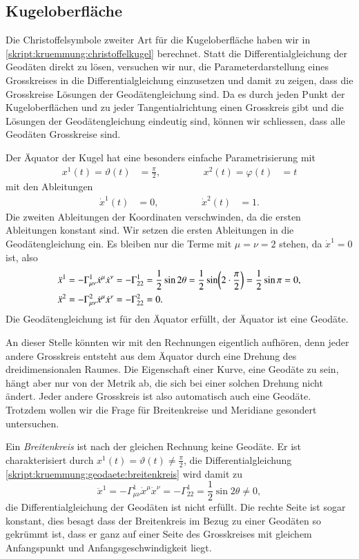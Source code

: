 \subsection{Kugeloberfläche}
Die Christoffelsymbole zweiter Art für die Kugeloberfläche haben wir
in \eqref{skript:kruemmung:christoffelkugel} berechnet.
Statt die Differentialgleichung der Geodäten direkt zu lösen, versuchen
wir nur, die Parameterdarstellung eines Grosskreises in die
Differentialgleichung einzusetzen und damit zu zeigen, dass die
Grosskreise Lösungen der Geodätengleichung sind.
Da es durch jeden Punkt der Kugeloberflächen und zu jeder Tangentialrichtung
einen Grosskreis gibt und die Lösungen der Geodätengleichung eindeutig
sind, können wir schliessen, dass alle Geodäten Grosskreise sind.

Der Äquator der Kugel hat eine besonders einfache Parametrisierung mit
%
\[
\begin{aligned}
x^1(t)=\vartheta(t)&=\frac{\pi}2,
&\qquad&&
x^2(t)=\varphi(t)&=t
\end{aligned}
\]
mit den Ableitungen
\[
\begin{aligned}
\dot x^1(t)&=0,
&\qquad&&
\dot x^2(t)&=1.
\end{aligned}
\]
Die zweiten Ableitungen der Koordinaten verschwinden, da die ersten
Ableitungen konstant sind.
Wir setzen die ersten Ableitungen in die Geodätengleichung ein.
Es bleiben nur die Terme mit $\mu=\nu=2$ stehen, da $\dot x^1=0$ ist,
also
\begin{align}
\ddot x^1
&=
-\Gamma_{\mu\nu}^1\dot x^\mu\dot x^\nu
=
-\Gamma_{22}^1=\frac12\sin2\theta
=
\frac12\sin\biggl( 2\cdot\frac{\pi}2\biggr)
=
\frac12\sin\pi
=
0,
\label{skript:kruemmung:geodaete:breitenkreis}
\\
\ddot x^2
&=
-\Gamma_{\mu\nu}^2\dot x^\mu\dot x^\nu
=
-\Gamma_{22}^2=0.
\notag
\end{align}
Die Geodätengleichung ist für den Äquator erfüllt, der Äquator ist
eine Geodäte.

An dieser Stelle könnten wir mit den Rechnungen eigentlich aufhören, 
denn jeder andere Grosskreis entsteht aus dem Äquator durch eine
Drehung des dreidimensionalen Raumes.
Die Eigenschaft einer Kurve, eine Geodäte zu sein, hängt aber nur von
der Metrik ab, die sich bei einer solchen Drehung nicht ändert.
Jeder andere Grosskreis ist also automatisch auch eine Geodäte.
Trotzdem wollen wir die Frage für Breitenkreise und Meridiane
gesondert untersuchen.

Ein {\em Breitenkreis} ist nach der gleichen Rechnung keine Geodäte.
%
Er ist charakterisiert durch $x^1(t)=\vartheta(t)\ne\frac{\pi}2$,
die Differentialgleichung
\eqref{skript:kruemmung:geodaete:breitenkreis}
wird damit zu
\[
\ddot x^1
=
-\Gamma_{\mu\nu}^1\dot x^\mu\dot x^\nu
=
-\Gamma_{22}^1
=
\frac12\sin2\theta
\ne
0,
\]
die Differentialgleichung der Geodäten ist nicht erfüllt.
Die rechte Seite ist sogar konstant, dies besagt dass der Breitenkreis
im Bezug zu einer Geodäten so gekrümmt ist, dass er ganz
auf einer Seite des Grosskreises mit gleichem Anfangspunkt und
Anfangsgeschwindigkeit liegt.

